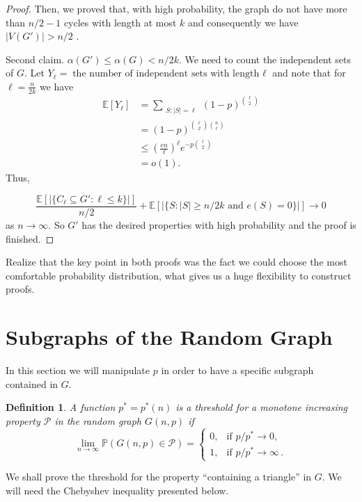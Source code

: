 \documentclass[12pt,twoside,a4paper,bibliography=totocnumbered]{book}
\numberwithin{equation}{section}
\newtheorem{definition}	[theorem] {Definition}
\theoremstyle{remark}
\begin{document}
\begin{proof}
Then, we proved that, with high probability, the graph do not have more than $n/2 -1$ cycles with length at most $k$ and consequently we have $|V(G')| > n/2$ .

Second claim. $\alpha(G') \leq \alpha(G) < n/2k$. We need to count the independent sets of $G$. Let $Y_{\ell} = \text{the number of independent sets with length ${\ell}$}$ and note that for $\ell = \frac{n}{2k}$ we have
\begin{align*}
\mathbb{E}[Y_{\ell}] &= \sum_{\substack{S\colon|S| = {\ell}}} (1-p)^{\binom{{\ell}}{2}}\\
	       &= (1-p)^{\binom{{\ell}}{2} \binom{n}{{\ell}}} \\
	       &\leq \left(\frac{en}{{\ell}}\right)^{\ell} e^{-p\binom{{\ell}}{2}}\\
	       &=o(1).
\end{align*}
Thus,

$$\frac{\mathbb{E}[|\{C_{\ell} \subseteq G' \colon {\ell}\leq k \}|]}{n/2} + \mathbb{E} [|\{ S \colon |S| \geq n/2k \text{ and } e(S) = 0\}|] \rightarrow 0$$
as $n \rightarrow \infty $. So $G'$ has the desired properties with high probability and the proof is finished.
\end{proof}

Realize that the key point in both proofs was the fact we could choose the most comfortable probability distribution, what gives us a huge flexibility to construct proofs.

\section{Subgraphs of the Random Graph}

In this section we will manipulate $p$ in order to have a specific subgraph contained in $G$. 

\begin{definition}
A function $p^* = p^*(n)$ is a threshold for a monotone increasing property $\mathcal{P}$ in the random graph $G(n,p)$ if
$$\lim_{n \rightarrow \infty} \mathbb{P}(G(n,p)\in \mathcal{P}) =  \begin{cases}
		0, &\text{if $p/p^*\rightarrow 0$},\\
		1, &\text{if $p/p^*\rightarrow \infty$}\,.
\end{cases}$$ 
\end{definition}

We shall prove the threshold for the property ``containing a triangle'' in $G$.  We will need the Chebyshev inequality presented below.
\end{document}
